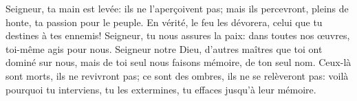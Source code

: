 Seigneur, ta main est levée: ils ne l’aperçoivent pas;
	mais ils percevront, pleins de honte, ta passion pour le peuple.
En vérité, le feu les dévorera, celui que tu destines à tes ennemis!
Seigneur, tu nous assures la paix:
	dans toutes nos œuvres, toi-même agis pour nous.
Seigneur notre Dieu, d’autres maîtres que toi ont dominé sur nous,
	mais de toi seul nous faisons mémoire, de ton seul nom.
Ceux-là sont morts, ils ne revivront pas;
	ce sont des ombres, ils ne se relèveront pas:
	voilà pourquoi tu interviens, tu les extermines, tu effaces jusqu’à leur mémoire.
